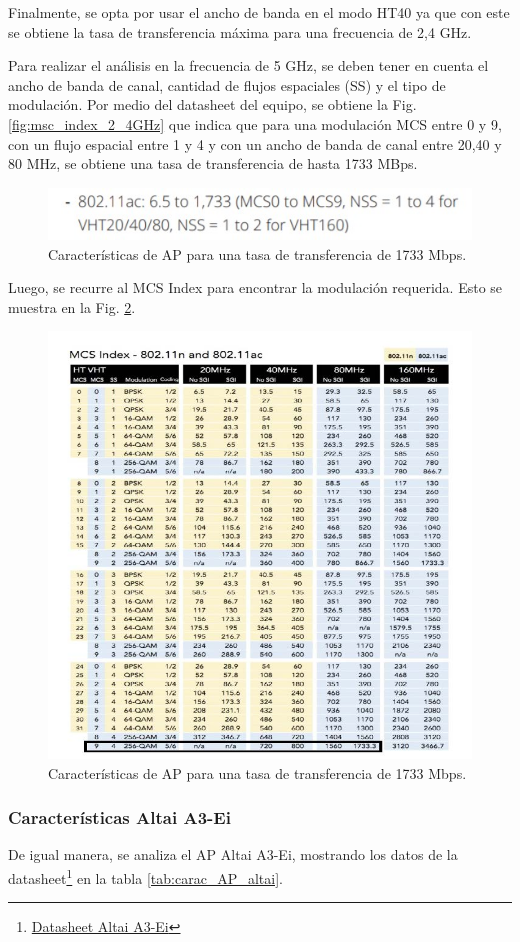 \documentclass[11pt,a4paper]{article}
\begin{document}
Finalmente, se opta por usar el ancho de banda en el modo HT40 ya que con este se obtiene la tasa de transferencia máxima para una frecuencia de 2,4 GHz.

Para realizar el análisis en la frecuencia de 5 GHz, se deben tener en cuenta el ancho de banda de canal, cantidad de flujos espaciales (SS) y el tipo de modulación. 
Por medio del datasheet del equipo, se obtiene la Fig. \ref{fig:msc_index_2_4GHz} que indica que para una modulación MCS entre 0 y 9, con un flujo espacial entre 1 y 4 y con un ancho de banda de canal entre 20,40 y 80 MHz, se obtiene una tasa de transferencia de hasta 1733 MBps.

\begin{figure}[htbp]
  \centering
  \includegraphics[width=0.5\linewidth]{fotos_ema/carac_ap_1733.jpg}
  \caption{Características de AP para una tasa de transferencia de 1733 Mbps.}
  \label{fig:carac_ap_1733}
\end{figure}

Luego, se recurre al MCS Index para encontrar la modulación requerida. 
Esto se muestra en la Fig. \ref{fig:msc_index_5_GHz}.

\begin{figure}[htbp]
  \centering
  \includegraphics[width=0.5\linewidth]{fotos_ema/msc_index_5_GHz.jpg}
  \caption{Características de AP para una tasa de transferencia de 1733 Mbps.}
  \label{fig:msc_index_5_GHz}
\end{figure}


\subsubsection{Características Altai A3-Ei}

De igual manera, se analiza el AP Altai A3-Ei, mostrando los datos de la datasheet\footnote{\href{https://www.altaitechnologies.com/portfolio-item/a3-ei/}{Datasheet Altai A3-Ei}} en la tabla \ref{tab:carac_AP_altai}.
\end{document}
